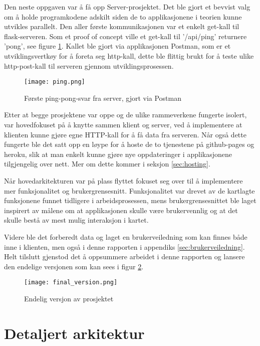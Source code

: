 Den neste oppgaven var å få opp Server-prosjektet. Det ble gjort et bevvist valg om å holde programkodene adskilt siden de to applikasjonene i teorien kunne utvikles parallelt. Den aller første kommunikasjonen var et enkelt get-kall til flask-serveren. Som et proof of concept ville et get-kall til '/api/ping' returnere 'pong', see figure \ref{fig:firstping}. Kallet ble gjort via applikasjonen Postman, som er et utviklingsvertkøy for å foreta seg http-kall, dette ble flittig brukt for å teste ulike http-post-kall til serveren gjennom utviklingsprosessen.

\begin{figure}[h]
    \center
    \texttt{[image: ping.png]}
    \caption{Første ping-pong-svar fra server, gjort via Postman}
    \label{fig:firstping}
\end{figure}

Etter at begge prosjektene var oppe og de ulike rammeverkene fungerte isolert, var hovedfokuset på å knytte sammen klient og server, ved å implementere at klienten kunne gjøre egne HTTP-kall for å få data fra serveren. Når også dette fungerte ble det satt opp en løype for å hoste de to tjenestene på github-pages og heroku, slik at man enkelt kunne gjøre nye oppdateringer i applikasjonene tilgjengelig over nett. Mer om dette kommer i seksjon \ref{sec:hosting}.

Når hovedarkitekturen var på plass flyttet fokuset seg over til å implementere mer funksjonalitet og brukergrensesnitt. Funksjonalitet var drevet av de kartlagte funksjonene funnet tidligere i arbeidsprosessen, mens brukergrensesnittet ble laget inspirert av målene om at applikasjonen skulle være brukervennlig og at det skulle bestå av mest mulig interaksjon i kartet.

Videre ble det forberedt data og laget en brukerveiledning som kan finnes både inne i klienten, men også i denne rapporten i appendiks \ref{sec:brukerveiledning}. Helt tilslutt gjenstod det å oppsummere arbeidet i denne rapporten og lansere den endelige versjonen som kan sees i figur \ref{fig:final-version}.

\begin{figure}[h]
    \center
    \texttt{[image: final\_version.png]}
    \caption{Endelig versjon av prosjektet}
    \label{fig:final-version}
\end{figure}

\section{Detaljert arkitektur}

